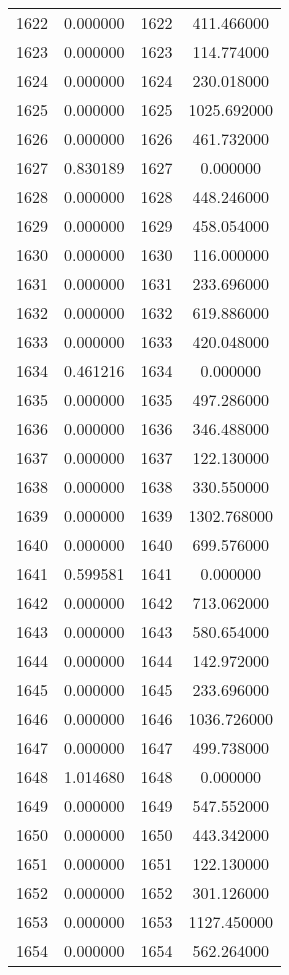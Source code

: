 \documentclass[12pt]{article}
\begin{document}
\begin{longtable}{@{}cccc@{}}
1622 & 0.000000 & 1622 & 411.466000 \\
1623 & 0.000000 & 1623 & 114.774000 \\
1624 & 0.000000 & 1624 & 230.018000 \\
1625 & 0.000000 & 1625 & 1025.692000 \\
1626 & 0.000000 & 1626 & 461.732000 \\
1627 & 0.830189 & 1627 & 0.000000 \\
1628 & 0.000000 & 1628 & 448.246000 \\
1629 & 0.000000 & 1629 & 458.054000 \\
1630 & 0.000000 & 1630 & 116.000000 \\
1631 & 0.000000 & 1631 & 233.696000 \\
1632 & 0.000000 & 1632 & 619.886000 \\
1633 & 0.000000 & 1633 & 420.048000 \\
1634 & 0.461216 & 1634 & 0.000000 \\
1635 & 0.000000 & 1635 & 497.286000 \\
1636 & 0.000000 & 1636 & 346.488000 \\
1637 & 0.000000 & 1637 & 122.130000 \\
1638 & 0.000000 & 1638 & 330.550000 \\
1639 & 0.000000 & 1639 & 1302.768000 \\
1640 & 0.000000 & 1640 & 699.576000 \\
1641 & 0.599581 & 1641 & 0.000000 \\
1642 & 0.000000 & 1642 & 713.062000 \\
1643 & 0.000000 & 1643 & 580.654000 \\
1644 & 0.000000 & 1644 & 142.972000 \\
1645 & 0.000000 & 1645 & 233.696000 \\
1646 & 0.000000 & 1646 & 1036.726000 \\
1647 & 0.000000 & 1647 & 499.738000 \\
1648 & 1.014680 & 1648 & 0.000000 \\
1649 & 0.000000 & 1649 & 547.552000 \\
1650 & 0.000000 & 1650 & 443.342000 \\
1651 & 0.000000 & 1651 & 122.130000 \\
1652 & 0.000000 & 1652 & 301.126000 \\
1653 & 0.000000 & 1653 & 1127.450000 \\
1654 & 0.000000 & 1654 & 562.264000 \\

\end{longtable}
\end{document}
